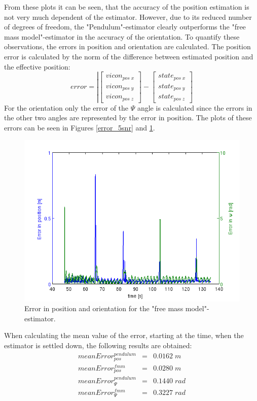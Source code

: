 From these plots it can be seen, that the accuracy of the position estimation is not very much dependent of the estimator. However, due to its reduced number of degrees of freedom, the "Pendulum"-estimator clearly outperforms the "free mass model"-estimator in the accuracy of the orientation. 
To quantify these observations, the errors in position and orientation are calculated. The position error is calculated by the norm of the difference between estimated position and the effective position: 
\begin{equation}
error= \left\vert \begin{bmatrix} vicon_{pos\;x} \\ vicon_{pos\;y} \\ vicon_{pos\;z} \end{bmatrix}-\begin{bmatrix}state_{pos\;x} \\ state_{pos\;y} \\ state_{pos\;z} \end{bmatrix}
\end{equation}
For the orientation only the error of the $\Psi$ angle is calculated since the errors in the other two angles are represented by the error in position. 
The plots of these errors can be seen in Figures \ref{error_5snr} and \ref{error_5snr_fmm}. 
\begin{figure}[h]
\centering
\includegraphics[width=1\textwidth]{pictures/2_2_fmm_SNR5_errors_GPS.png}
\caption{Error in position and orientation for the "free mass model"-estimator.}
\label{error_5snr_fmm}
\end{figure}
When calculating the mean value of the error, starting at the time, when the estimator is settled down, the following results are obtained:
\begin{eqnarray}
meanError_{pos}^{pendulum}&=&0.0162\;m \\ meanError_{pos}^{fmm}&=&0.0280\;m \\ meanError_{\Psi}^{pendulum}&=& 0.1440\;rad\\ meanError_{\Psi}^{fmm}&=& 0.3227 \;rad
\end{eqnarray} 



